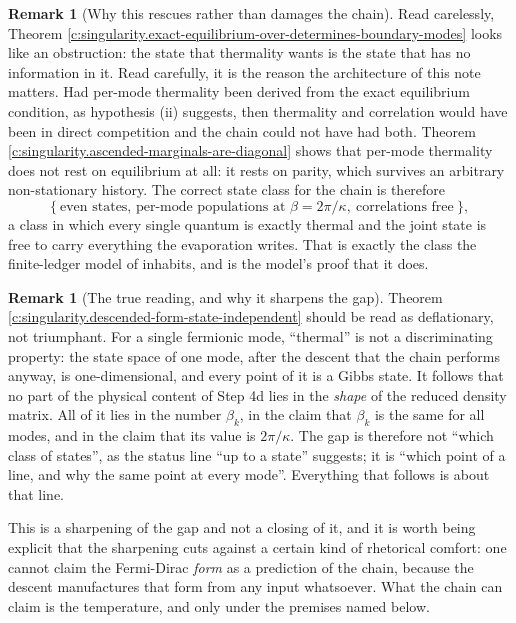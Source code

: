 \documentclass[11pt]{article}
\theoremstyle{definition}
\newtheorem{remark}[theorem]{Remark}
\theoremstyle{plain}
\newcommand{\changedmark}[2]{\marginpar{\raggedright\scriptsize\color{#1}#2}}
\begin{document}
\begin{remark}[Why this rescues rather than damages the chain]\label{c:note.state-selection.why-rescues-rather-than-damages-chain}
\changedmark{MidnightBlue}{added since the deposit}
Read carelessly, Theorem \ref{c:singularity.exact-equilibrium-over-determines-boundary-modes} looks like an obstruction: the state that thermality wants is the state that has no information in it. Read carefully, it is the reason the architecture of this note matters. Had per-mode thermality been derived from the exact equilibrium condition, as hypothesis (ii) suggests, then thermality and correlation would have been in direct competition and the chain could not have had both. Theorem \ref{c:singularity.ascended-marginals-are-diagonal} shows that per-mode thermality does not rest on equilibrium at all: it rests on parity, which survives an arbitrary non-stationary history. The correct state class for the chain is therefore
\[
\bigl\{\ \text{even states, per-mode populations at } \beta = 2\pi/\kappa, \ \text{correlations free}\ \bigr\},
\]
a class in which every single quantum is exactly thermal and the joint state is free to carry everything the evaporation writes. That is exactly the class the finite-ledger model of \cite[\S 12]{ButlerT5} inhabits, and \cite[Lem.~12.1]{ButlerT5} is the model's proof that it does.
\end{remark}

\begin{remark}[The true reading, and why it sharpens the gap]\label{c:note.state-selection.true-reading-why-it-sharpens-gap}
\changedmark{MidnightBlue}{added since the deposit}
Theorem \ref{c:singularity.descended-form-state-independent} should be read as deflationary, not triumphant. For a single fermionic mode, ``thermal'' is not a discriminating property: the state space of one mode, after the descent that the chain performs anyway, is one-dimensional, and every point of it is a Gibbs state. It follows that no part of the physical content of Step 4d lies in the \emph{shape} of the reduced density matrix. All of it lies in the number $\beta_k$, in the claim that $\beta_k$ is the same for all modes, and in the claim that its value is $2\pi/\kappa$. The gap is therefore not ``which class of states'', as the status line ``up to a state'' suggests; it is ``which point of a line, and why the same point at every mode''. Everything that follows is about that line.

This is a sharpening of the gap and not a closing of it, and it is worth being explicit that the sharpening cuts against a certain kind of rhetorical comfort: one cannot claim the Fermi-Dirac \emph{form} as a prediction of the chain, because the descent manufactures that form from any input whatsoever. What the chain can claim is the temperature, and only under the premises named below.
\end{remark}
\end{document}
